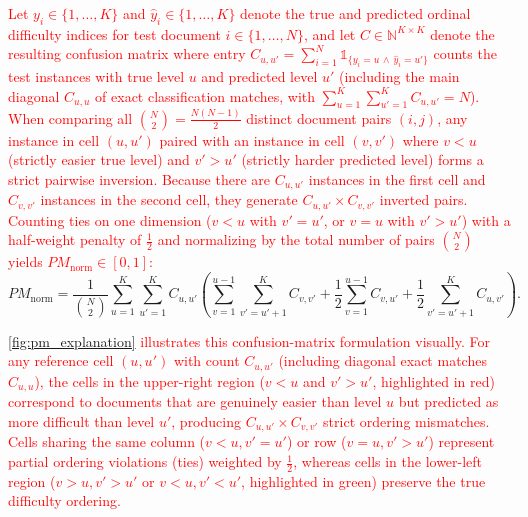 \textcolor{red}{Let $y_i \in \{1, \dots, K\}$ and $\hat{y}_i \in \{1, \dots, K\}$ denote the true and predicted ordinal difficulty indices for test document $i \in \{1, \dots, N\}$, and let $C \in \mathbb{N}^{K \times K}$ denote the resulting confusion matrix where entry $C_{u,u'} = \sum_{i=1}^N \mathds{1}_{\{y_i = u \,\land\, \hat{y}_i = u'\}}$ counts the test instances with true level $u$ and predicted level $u'$ (including the main diagonal $C_{u,u}$ of exact classification matches, with $\sum_{u=1}^K \sum_{u'=1}^K C_{u,u'} = N$). When comparing all $\binom{N}{2} = \frac{N(N-1)}{2}$ distinct document pairs $(i, j)$, any instance in cell $(u, u')$ paired with an instance in cell $(v, v')$ where $v < u$ (strictly easier true level) and $v' > u'$ (strictly harder predicted level) forms a strict pairwise inversion. Because there are $C_{u,u'}$ instances in the first cell and $C_{v,v'}$ instances in the second cell, they generate $C_{u,u'} \times C_{v,v'}$ inverted pairs. Counting ties on one dimension ($v < u$ with $v' = u'$, or $v = u$ with $v' > u'$) with a half-weight penalty of $\frac{1}{2}$ and normalizing by the total number of pairs $\binom{N}{2}$ yields $PM_{\text{norm}} \in [0, 1]$:}
{\color{red}\begin{equation}
PM_{\text{norm}} = \frac{1}{\binom{N}{2}} \sum_{u=1}^{K} \sum_{u'=1}^{K} C_{u,u'} \left( \sum_{v=1}^{u-1} \sum_{v'=u'+1}^{K} C_{v,v'} + \frac{1}{2} \sum_{v=1}^{u-1} C_{v,u'} + \frac{1}{2} \sum_{v'=u'+1}^{K} C_{u,v'} \right).
\label{eq:pm_norm}
\end{equation}}

\textcolor{red}{\autoref{fig:pm_explanation} illustrates this confusion-matrix formulation visually. For any reference cell $(u, u')$ with count $C_{u,u'}$ (including diagonal exact matches $C_{u,u}$), the cells in the upper-right region ($v < u$ and $v' > u'$, highlighted in red) correspond to documents that are genuinely easier than level $u$ but predicted as more difficult than level $u'$, producing $C_{u,u'} \times C_{v,v'}$ strict ordering mismatches. Cells sharing the same column ($v < u, v' = u'$) or row ($v = u, v' > u'$) represent partial ordering violations (ties) weighted by $\frac{1}{2}$, whereas cells in the lower-left region ($v > u, v' > u'$ or $v < u, v' < u'$, highlighted in green) preserve the true difficulty ordering.}

